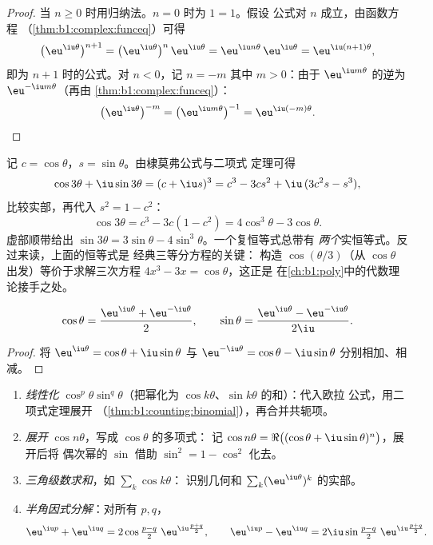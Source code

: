 \begin{proof}
当 $n \geq 0$ 时用归纳法。$n = 0$ 时为 $1 = 1$。假设
公式对 $n$ 成立，由函数方程
（\cref{thm:b1:complex:funceq}）可得
\[
\bigl(\eu^{\iu\theta}\bigr)^{n+1}
= \bigl(\eu^{\iu\theta}\bigr)^{n}\,\eu^{\iu\theta}
= \eu^{\iu n\theta}\,\eu^{\iu\theta}
= \eu^{\iu(n+1)\theta} ,
\]
即为 $n + 1$ 时的公式。对 $n < 0$，记 $n = -m$
其中 $m > 0$：由于 $\eu^{\iu m\theta}$ 的逆为
$\eu^{-\iu m\theta}$（再由 \cref{thm:b1:complex:funceq}）：
\[
\bigl(\eu^{\iu\theta}\bigr)^{-m}
= \bigl(\eu^{\iu m\theta}\bigr)^{-1}
= \eu^{\iu(-m)\theta} . \qedhere
\]
\end{proof}

\begin{example}\label{ex:b1:complex:cos3}
记 $c = \cos\theta$，$s = \sin\theta$。由棣莫弗公式与二项式
定理可得
\[
\cos 3\theta + \iu \sin 3\theta = (c + \iu s)^3
= c^3 - 3cs^2 + \iu\,(3c^2 s - s^3),
\]
比较实部，再代入 $s^2 = 1 - c^2$：
\[
\cos 3\theta = c^3 - 3c(1 - c^2) = 4\cos^3\theta - 3\cos\theta .
\]
虚部顺带给出 $\sin 3\theta = 3\sin\theta -
4\sin^3\theta$。一个复恒等式总带有
\emph{两个}实恒等式。反过来读，上面的恒等式是
经典三等分方程的关键：
构造 $\cos(\theta/3)$（从 $\cos\theta$ 出发）等价于求解三次方程 $4x^3 -
3x = \cos\theta$，这正是
在\cref{ch:b1:poly}中的代数理论接手之处。
\end{example}

\begin{proposition}[欧拉公式]\label{prop:b1:complex:euler}
\[
\cos\theta = \frac{\eu^{\iu\theta} + \eu^{-\iu\theta}}{2},
\qquad
\sin\theta = \frac{\eu^{\iu\theta} - \eu^{-\iu\theta}}{2\iu}.
\]
\end{proposition}

\begin{proof}
将 $\eu^{\iu\theta} = \cos\theta +
\iu\sin\theta$ 与 $\eu^{-\iu\theta} = \cos\theta - \iu\sin\theta$ 分别相加、相减。
\end{proof}

\begin{method}[用指数函数处理三角]\label{met:b1:complex:trig}
\begin{enumerate}
  \item \emph{线性化} $\cos^p\theta \sin^q\theta$（把幂化为
        $\cos k\theta$、$\sin k\theta$ 的和）：代入欧拉
        公式，用二项式定理展开
        （\cref{thm:b1:counting:binomial}），再合并共轭项。
  \item \emph{展开} $\cos n\theta$，写成 $\cos\theta$ 的多项式：
        记 $\cos n\theta = \Re\bigl((\cos\theta +
        \iu\sin\theta)^n\bigr)$，展开后将
        偶次幂的 $\sin$ 借助 $\sin^2 = 1 - \cos^2$ 化去。
  \item \emph{三角级数求和}，如 $\sum_k \cos k\theta$：
        识别几何和 $\sum_k
        (\eu^{\iu\theta})^k$ 的实部。
  \item \emph{半角因式分解}：对所有 $p, q$，
        \[
        \eu^{\iu p} + \eu^{\iu q}
        = 2 \cos\tfrac{p - q}{2}\; \eu^{\iu \frac{p+q}{2}},
        \qquad
        \eu^{\iu p} - \eu^{\iu q}
        = 2\iu \sin\tfrac{p - q}{2}\; \eu^{\iu \frac{p+q}{2}} .
        \]
\end{enumerate}
\end{method}

